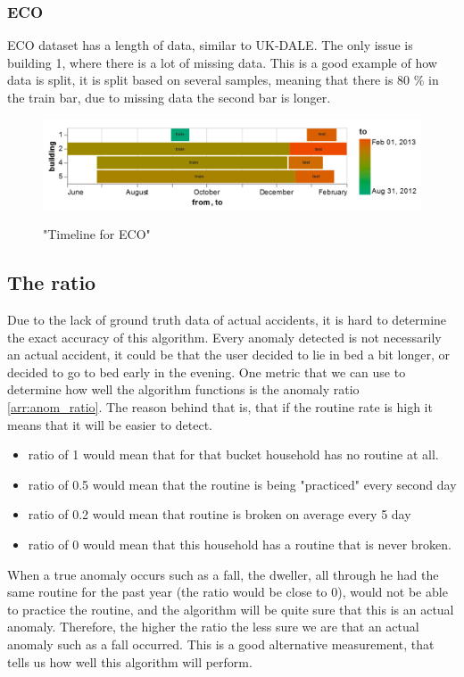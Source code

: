 \subsubsection{ECO}
ECO dataset has a length of data, similar to UK-DALE. 
The only issue is building 1, where there is a lot of missing data.
This is a good example of how data is split, it is split based on several samples,
meaning that there is 80 \% in the train bar, due to missing data the second bar is longer. 

\begin{figure}[H]
	\centering
	\caption{"Timeline for ECO"}
	\includegraphics[width=1\textwidth]{Figures/EC/eco_timeline.png}
	\label{fig:eco_timeline}
\end{figure}


\subsection{The ratio}

Due to the lack of ground truth data of actual accidents, it is hard to determine the 
exact accuracy of this algorithm. Every anomaly detected is not necessarily an 
actual accident, it could be that the user decided to lie in bed a bit longer, or decided to go to bed early in the evening.
One metric that we can use to determine how well the algorithm functions is the anomaly ratio \ref{arr:anom_ratio}.
The reason behind that is, that if the routine rate is high it means that it will be easier to detect.

\begin{itemize}
	\item ratio of 1 would mean that for that bucket household has no routine at all.
    \item ratio of 0.5 would mean that the routine is being "practiced" every second day
    \item ratio of 0.2 would mean that routine is broken on average every 5 day
    \item ratio of 0 would mean that this household has a routine that is never broken. 
\end{itemize}

When a true anomaly occurs such as a fall, the dweller, all through he had the same routine for the past year (the ratio would be close to 0), would not be able to practice the routine, and the algorithm will be quite sure that this is an actual anomaly.
Therefore, the higher the ratio the less sure we are that an actual anomaly such as a fall occurred.
This is a good alternative measurement, that tells us how well this algorithm will perform. 

